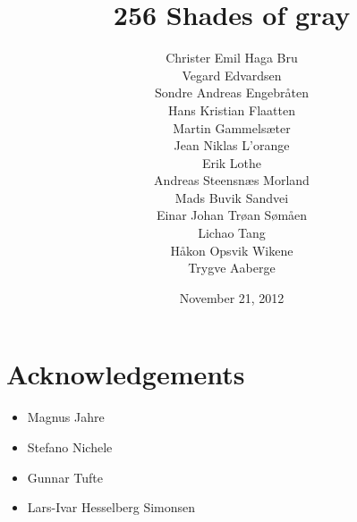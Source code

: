 \documentclass{report}
\begin{document}
\title{256 Shades of gray}
\author{
Christer Emil Haga Bru\\
Vegard Edvardsen\\
Sondre Andreas Engebråten\\
Hans Kristian Flaatten\\
Martin Gammelsæter\\
Jean Niklas L'orange\\ %
Erik Lothe\\
Andreas Steensnæs Morland\\
Mads Buvik Sandvei\\
Einar Johan Trøan Sømåen\\
Lichao Tang\\
Håkon Opsvik Wikene\\
Trygve Aaberge\\
}
\date{November 21, 2012}

\maketitle

\newpage
\thispagestyle{empty}
\mbox{}




\chapter*{Acknowledgements}
\begin{itemize} %
\item Magnus Jahre
\item Stefano Nichele
\item Gunnar Tufte
\item Lars-Ivar Hesselberg Simonsen %
\end{itemize}


\tableofcontents
\listoffigures
\listoftables
\newpage
{}













\appendix






\end{document}
